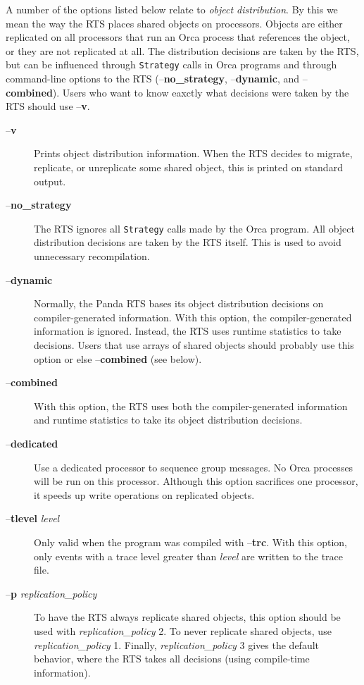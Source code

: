 \documentclass[10pt]{article}
\begin{document}
A number of the options listed below relate to {\em object
distribution}. By this we mean the way the RTS places shared objects
on processors. Objects are either replicated on all processors that
run an Orca process that references the object, or they are not
replicated at all. The distribution decisions are taken by the RTS,
but can be influenced through \verb+Strategy+ calls in Orca programs
and through command-line options to the RTS (--{\bf no\_strategy},
--{\bf dynamic}, and --{\bf combined}). Users who want to know eaxctly
what decisions were taken by the RTS should use --{\bf v}.
\begin{description}
\item[--{\bf v}]
Prints object distribution information. When the
RTS decides to migrate, replicate, or unreplicate some shared object,
this is printed on standard output.
\item[--{\bf no\_strategy}]
The RTS ignores all \verb+Strategy+ calls made by the Orca program. All
object distribution decisions are taken by the RTS itself. This is
used to avoid unnecessary recompilation.
\item[--{\bf dynamic}]
Normally, the Panda RTS bases its object distribution decisions on
compiler-generated information. With this option, the
compiler-generated information is ignored. Instead, the RTS uses
runtime statistics to take decisions.  Users that use arrays of shared
objects should probably use this option or else --{\bf combined} (see below).
\item[--{\bf combined}]
With this option, the RTS uses both the compiler-generated information
and runtime statistics to take its object distribution decisions.
\item[--{\bf dedicated}]
Use a dedicated processor to sequence group messages. No Orca
processes will be run on this processor. Although this option sacrifices one
processor, it speeds up write operations on replicated objects.
\item[--{\bf tlevel} {\em level}]
Only valid when the program was compiled with --{\bf trc}. With this
option, only events with a trace level greater than {\em level} are
written to the trace file.
\item[--{\bf p} {\em replication\_policy}]
To have the RTS always replicate shared objects,
this option should be used with {\em replication\_policy} 2. To never
replicate shared objects, use {\em replication\_policy} 1. Finally,
{\em replication\_policy} 3 gives the default behavior, where the RTS takes
all decisions (using compile-time information).

\end{description}
\end{document}
